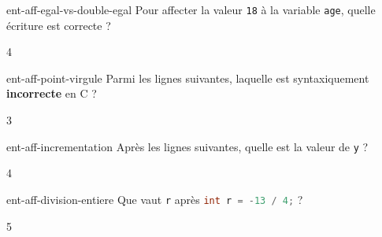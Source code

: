 
\begin{question}{ent-aff-egal-vs-double-egal}
    Pour affecter la valeur \texttt{18} à la variable \texttt{age}, quelle écriture est correcte ?
    \begin{multicols}{4}
        \begin{reponses}
        \end{reponses}
    \end{multicols}
\end{question}

\begin{question}{ent-aff-point-virgule}
    Parmi les lignes suivantes, laquelle est syntaxiquement \textbf{incorrecte} en C ?
    \begin{multicols}{3}
        \begin{reponses}
        \end{reponses}
    \end{multicols}
\end{question}

\begin{question}{ent-aff-incrementation}
    Après les lignes suivantes, quelle est la valeur de \texttt{y} ?
    
    \begin{multicols}{4}
        \begin{reponses}
        \end{reponses}
    \end{multicols}
\end{question}

\begin{question}{ent-aff-division-entiere}
    Que vaut \texttt{r} après \lstinline[language=C]|int r = -13 / 4;| ?
    \begin{multicols}{5}
        \begin{reponses}
        \end{reponses}
    \end{multicols}
\end{question}

